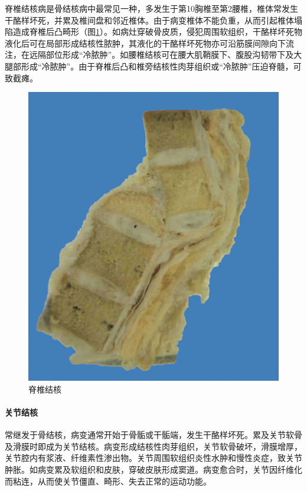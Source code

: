 脊椎结核病是骨结核病中最常见一种，多发生于第10胸椎至第2腰椎，椎体常发生干酪样坏死，并累及椎间盘和邻近椎体。由于病变椎体不能负重，从而引起椎体塌陷造成脊椎后凸畸形（图\ref{fig14-9}）。如病灶穿破骨皮质，侵犯周围软组织，干酪样坏死物液化后可在局部形成结核性脓肿，其液化的干酪样坏死物亦可沿筋膜间隙向下流注，在远隔部位形成“冷脓肿”。如腰椎结核可在腰大肌鞘膜下、腹股沟韧带下及大腿部形成“冷脓肿”。由于脊椎后凸和椎旁结核性肉芽组织或“冷脓肿”压迫脊髓，可致截瘫。

\begin{figure}[!htbp]
    \centering
    \includegraphics{./images/Image00234.jpg}
    \captionsetup{justification=centering}
    \caption{脊椎结核}
    \label{fig14-9}
\end{figure}

\paragraph{关节结核}
常继发于骨结核，病变通常开始于骨骺或干骺端，发生干酪样坏死。累及关节软骨及滑膜时即成为关节结核。病变形成结核性肉芽组织，关节软骨破坏，滑膜增厚，关节腔内有浆液、纤维素性渗出物。关节周围软组织炎性水肿和慢性炎症，致关节肿胀。如病变累及软组织和皮肤，穿破皮肤形成窦道。病变愈合时，关节因纤维化而粘连，从而使关节僵直、畸形、失去正常的运动功能。

